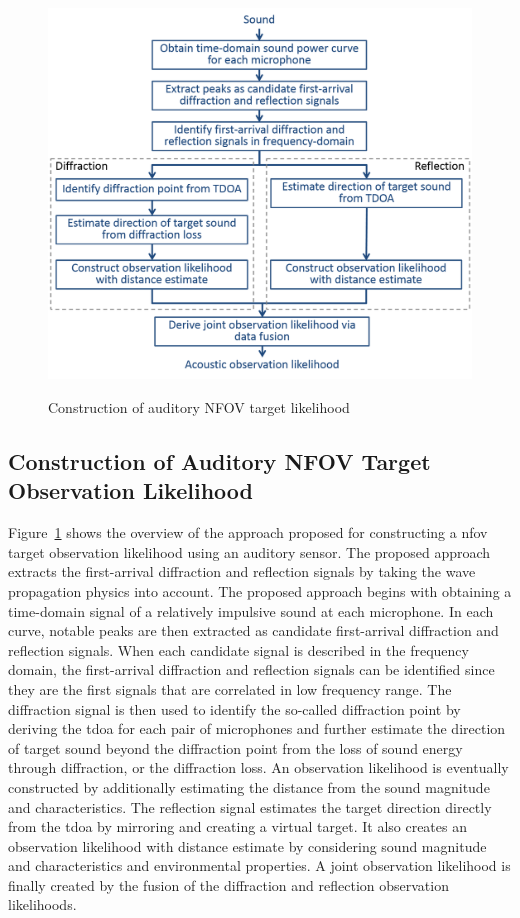 \documentclass[letterpaper, 10 pt, conference]{ieeeconf}  %
\begin{document}
\begin{figure}[h]
	{\centering
		\includegraphics[width=\columnwidth]{Figures/auditory_procedure.png}
	}
	\caption{\footnotesize {Construction of auditory NFOV target likelihood} }
	\label{fig:auditory_procedure}
\end{figure}
\subsection{Construction of Auditory NFOV Target Observation Likelihood}
Figure~\ref{fig:auditory_procedure} shows the overview of the approach proposed for constructing a \gls{nfov} target observation likelihood using an auditory sensor. The proposed approach extracts the first-arrival diffraction and reflection signals by taking the wave propagation physics into account. The proposed approach begins with obtaining a time-domain signal of a relatively impulsive sound at each microphone. In each curve, notable peaks are then extracted as candidate first-arrival diffraction and reflection signals. When each candidate signal is described in the frequency domain, the first-arrival diffraction and reflection signals can be identified since they are the first signals that are correlated in low frequency range. The diffraction signal is then used to identify the so-called diffraction point by deriving the \gls{tdoa} for each pair of microphones and further estimate the direction of target sound beyond the diffraction point from the loss of sound energy through diffraction, or the diffraction loss. An observation likelihood is eventually constructed by additionally estimating the distance from the sound magnitude and characteristics. The reflection signal estimates the target direction directly from the \gls{tdoa} by mirroring and creating a virtual target.  It also creates an observation likelihood with distance estimate by considering sound magnitude and characteristics and environmental properties. A joint observation likelihood is finally created by the fusion of the diffraction and reflection observation likelihoods.  
\end{document}

